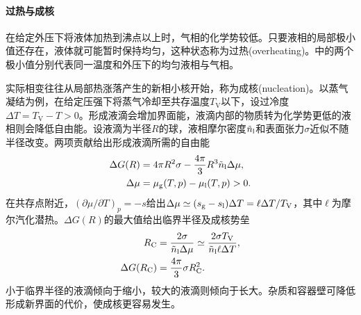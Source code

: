 \paragraph{过热与成核}

在给定外压下将液体加热到沸点以上时，气相的化学势较低。只要液相的局部极小值还存在，液体就可能暂时保持均匀，这种状态称为过热(overheating)。中的两个极小值分别代表同一温度和外压下的均匀液相与气相。
\begin{notecaptionblock}
	\label{fig:overheating}
\end{notecaptionblock}
实际相变往往从局部热涨落产生的新相小核开始，称为成核(nucleation)。以蒸气凝结为例，在给定压强下将蒸气冷却至共存温度$T_{\mathrm V}$以下，设过冷度$\Delta T = T_{\mathrm V} - T > 0$。形成液滴会增加界面能，液滴内部的物质转为化学势更低的液相则会降低自由能。设液滴为半径$R$的球，液相摩尔密度$\tilde n_\mathrm l$和表面张力$\sigma$近似不随半径改变。两项贡献给出形成液滴所需的自由能
\begin{subequations}
	\begin{align}
		\Delta G(R) &= 4\pi R^2\sigma - \frac{4\pi}3 R^3\tilde n_\mathrm l\Delta\mu,\\
		\Delta\mu &= \mu_\mathrm g(T,p) - \mu_\mathrm l(T,p) > 0.
	\end{align}
\end{subequations}
在共存点附近，$(\partial\mu/\partial T)_p = -s$给出$\Delta\mu \simeq (s_\mathrm g - s_\mathrm l)\Delta T = \ell\Delta T/T_{\mathrm V}$，其中$\ell$为摩尔汽化潜热。$\Delta G(R)$的最大值给出临界半径及成核势垒
\begin{subequations}
	\label{eq:sm-nucleation-barrier}
	\begin{align}
		R_\mathrm C &= \frac{2\sigma}{\tilde n_\mathrm l\Delta\mu}
		\simeq \frac{2\sigma T_{\mathrm V}}{\tilde n_\mathrm l\ell\Delta T},\\
		\Delta G(R_\mathrm C) &= \frac{4\pi}3\sigma R_\mathrm C^2 .
	\end{align}
\end{subequations}
小于临界半径的液滴倾向于缩小，较大的液滴则倾向于长大。杂质和容器壁可降低形成新界面的代价，使成核更容易发生。

\begin{notecaptionblock}
	\label{fig:nucleation}
\end{notecaptionblock}

